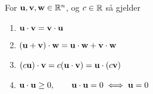 For $\mathbf{u},\mathbf{v},\mathbf{w} \in \mathbb{R}^n$, og $c \in \mathbb{R}$ så gjelder
\begin{enumerate}
  \item $\mathbf{u}\cdot\mathbf{v} = \mathbf{v}\cdot\mathbf{u}$
  \item $(\mathbf{u}+\mathbf{v})\cdot\mathbf{w} = \mathbf{u}\cdot\mathbf{w} + \mathbf{v}\cdot\mathbf{w}$
  \item $(c\mathbf{u})\cdot\mathbf{v} = c(\mathbf{u}\cdot\mathbf{v}) = \mathbf{u}\cdot(c\mathbf{v})$
  \item $\mathbf{u}\cdot\mathbf{u} \geq 0, \qquad \mathbf{u}\cdot\mathbf{u}=0 \iff \mathbf{u}=0$
\end{enumerate}
